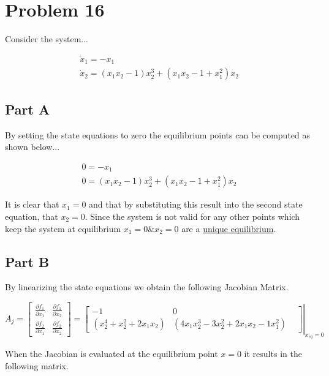 \section*{Problem 16}

Consider the system...

$$
\begin{array}{l}
\dot{x}_{1}=-x_{1} \\
\dot{x}_{2}=\left(x_{1} x_{2}-1\right) x_{2}^{3}+\left(x_{1} x_{2}-1+x_{1}^{2}\right) x_{2}
\end{array}
$$


\subsection*{Part A}

By setting the state equations to zero the equilibrium points can be computed as shown below...

$$
\begin{array}{l}
0=-x_{1} \\
0=\left(x_{1} x_{2}-1\right) x_{2}^{3}+\left(x_{1} x_{2}-1+x_{1}^{2}\right) x_{2}
\end{array}
$$

\noindent It is clear that $x_1 =0$ and that by substituting this result into the second state equation, that $x_2 = 0$. Since the system is not valid for any other points which keep the system at equilibrium $x_1=0 \& x_2 =0$ are a \underline{unique equilibrium}.


\subsection*{Part B}

By linearizing the state equations we obtain the following Jacobian Matrix.

$$
A_j =
\begin{bmatrix}
  \frac{\partial f_{1}}{\partial x_{1}} &  \frac{\partial f_{1}}{\partial x_{2}} \\
  \frac{\partial f_{2}}{\partial x_{1}} &  \frac{\partial f_{2}}{\partial x_{2}}
\end{bmatrix}
= \left .
\begin{bmatrix}
  -1 & 0 & \\
  (x_2^4 + x_2^2 + 2x_1x_2) & (4x_1x_2^3-3x_2^2 + 2x_1x_2 -1 x_1^2) &
\end{bmatrix}
\right \rvert_{x_{eq}=0}
$$

\noindent When the Jacobian is evaluated at the equilibrium point $x=0$ it results in the following matrix.

